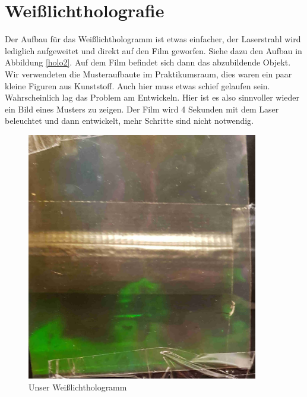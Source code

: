     \section{Weißlichtholografie}
Der Aufbau für das Weißlichthologramm ist etwas einfacher, der Laserstrahl wird lediglich aufgeweitet und direkt auf den Film geworfen. Siehe dazu den Aufbau in Abbildung \ref{holo2}. Auf dem Film befindet sich dann das abzubildende Objekt. Wir verwendeten die Musteraufbaute im Praktikumsraum, dies waren ein paar kleine Figuren aus Kunststoff. Auch hier muss etwas schief gelaufen sein. Wahrscheinlich lag das Problem am Entwickeln. Hier ist es also sinnvoller wieder ein Bild eines Musters zu zeigen. Der Film wird 4 Sekunden mit dem Laser beleuchtet und dann entwickelt, mehr Schritte sind nicht notwendig.
                \begin{figure}[htbp]
                  \begin{minipage}{0.45\textwidth}
                   \centering
                    \includegraphics[width=0.9\textwidth]{Abb/weislicht.jpg}
                    \caption{Unser Weißlichthologramm}
                  \end{minipage}\hfill
                  \begin{minipage}{0.45\textwidth}
                   \centering

\end{minipage}
\end{figure}
